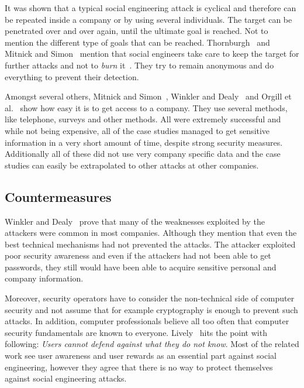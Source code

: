 It was shown that a typical social engineering attack is cyclical and
therefore can be repeated inside a company or by using several individuals. The
target can be penetrated over and over again, until the ultimate goal is
reached. Not to mention the different type of goals that can be reached.
Thornburgh~\cite{thornburgh2004} and Mitnick and Simon~\cite{mitnick2003}
mention that social engineers take care to keep the target for further attacks
and not to \textit{burn} it~\cite{thornburgh2004}. They try to remain anonymous
and do everything to prevent their detection.

Amongst several others, Mitnick and Simon~\cite{mitnick2003}, Winkler and
Dealy~\cite{winkler1995} and Orgill et al.~\cite{orgill2004} show how easy it
is to get access to a company. They use several methods, like telephone,
surveys and other methods. All were extremely successful and while not being
expensive, all of the case studies managed to get sensitive information in a
very short amount of time, despite strong security measures. Additionally all
of these did not use very company specific data and the case studies can easily
be extrapolated to other attacks at other companies.

\subsection{Countermeasures}

Winkler and Dealy~\cite{winkler1995} prove that many of the weaknesses
exploited by the attackers were common in most companies. Although they mention
that even the best technical mechanisms had not prevented the attacks. The
attacker exploited poor security awareness and even if the attackers had not
been able to get passwords, they still would have been able to acquire
sensitive personal and company information.

Moreover, security operators have to consider the non-technical side of
computer security and not assume that for example cryptography is enough to
prevent such attacks. In addition, computer professionals believe all too often that
computer security fundamentals are known to everyone. Lively~\cite{lively2003} hits
the point with following: \textit{\glqq{}Users cannot defend against what
they do not know\grqq{}}. Most of the related work see user awareness and user
rewards as an essential part against social engineering, however they agree that
there is no way to protect themselves against social engineering attacks.

